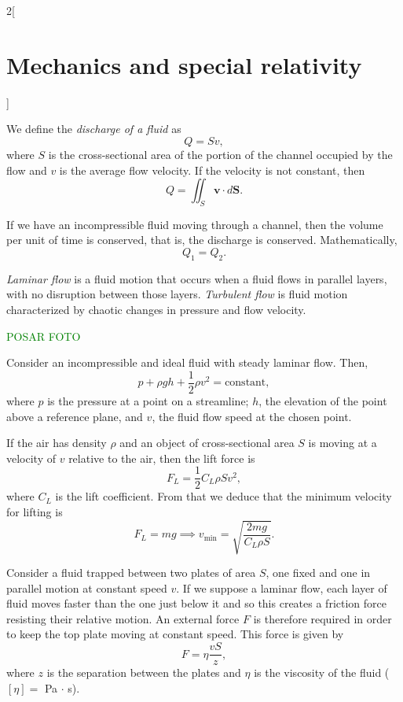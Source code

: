 \documentclass[class=article,10pt,crop=false]{standalone}
\begin{document}
\begin{multicols}{2}[\section{Mechanics and special relativity}]
\begin{concept}
\end{concept}
\begin{definition}
We define the \textit{discharge of a fluid} as $$Q=Sv,$$ where $S$ is the cross-sectional area of the portion of the channel occupied by the flow and $v$ is the average flow velocity. If the velocity is not constant, then $$Q=\iint_S\boldsymbol{v}\cdot d\boldsymbol{S}.$$
\end{definition}
\begin{concept}
If we have an incompressible fluid moving through a channel, then the volume per unit of time is conserved, that is, the discharge is conserved. Mathematically, $$Q_1=Q_2.$$
\end{concept}
\begin{definition}
\textit{Laminar flow} is a fluid motion that occurs when a fluid flows in parallel layers, with no disruption between those layers. \textit{Turbulent flow} is fluid motion characterized by chaotic changes in pressure and flow velocity. 
\end{definition}
\textcolor{green}{POSAR FOTO}
\begin{concept}
Consider an incompressible and ideal fluid with steady laminar flow. Then, $$p+\rho gh+\frac{1}{2}\rho v^2=\text{constant},$$ where $p$ is the pressure at a point on a streamline; $h$, the elevation of the point above a reference plane, and $v$, the fluid flow speed at the chosen point.
\end{concept}
\begin{concept}
If the air has density $\rho$ and an object of cross-sectional area $S$ is moving at a velocity of $v$ relative to the air, then the lift force is $$F_L=\frac{1}{2}C_L\rho Sv^2,$$ where $C_L$ is the lift coefficient. From that we deduce that the minimum velocity for lifting is $$F_L=mg\implies v_\text{min}=\sqrt{\frac{2mg}{C_L\rho S}}.$$
\end{concept}
\begin{concept}[Viscosity]
Consider a fluid trapped between two plates of area $S$, one fixed and one in parallel motion at constant speed $v$. If we suppose a laminar flow, each layer of fluid moves faster than the one just below it and so this creates a friction force  resisting their relative motion. An external force $F$ is therefore required in order to keep the top plate moving at constant speed. This force is given by $$F=\eta\frac{vS}{z},$$ where $z$ is the separation between the plates and $\eta$ is the viscosity of the fluid ($[\eta]=$ Pa $\cdot$ s). 

\end{concept}
\end{multicols}
\end{document}
